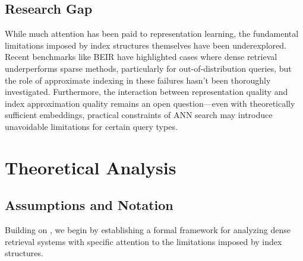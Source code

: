 \documentclass[sigconf,review]{acmart}
\begin{document}
\subsection{Research Gap}
While much attention has been paid to representation learning, the fundamental limitations imposed by index structures themselves have been underexplored. Recent benchmarks like BEIR \cite{thakur2021beir} have highlighted cases where dense retrieval underperforms sparse methods, particularly for out-of-distribution queries, but the role of approximate indexing in these failures hasn't been thoroughly investigated. Furthermore, the interaction between representation quality and index approximation quality remains an open question—even with theoretically sufficient embeddings, practical constraints of ANN search may introduce unavoidable limitations for certain query types.

\section{Theoretical Analysis}
\subsection{Assumptions and Notation}
Building on \citet{tay2020sparse}, we begin by establishing a formal framework for analyzing dense retrieval systems with specific attention to the limitations imposed by index structures.
\end{document}
